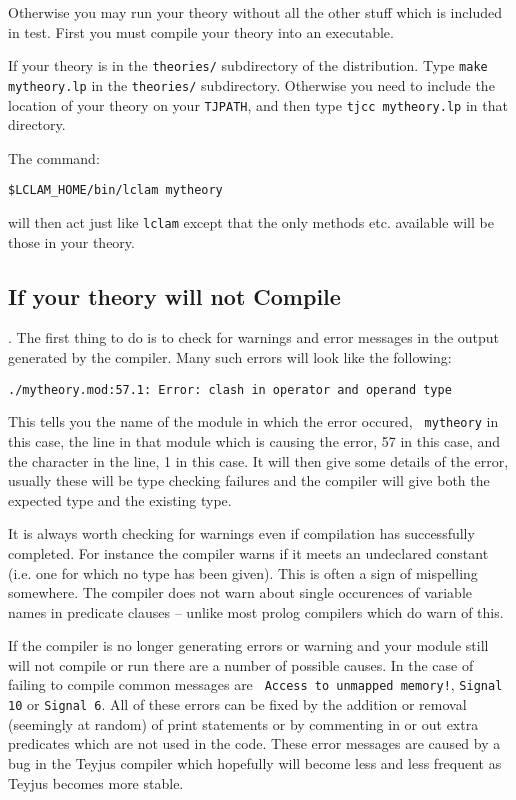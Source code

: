 Otherwise you may run your theory without all the other stuff
which is included in test.  First you must compile your theory into an 
executable.

If your theory is in the {\tt theories/} subdirectory of the
distribution.  Type {\tt make mytheory.lp} in the {\tt theories/}
subdirectory.  Otherwise you need to include the location of your
theory on your {\tt TJPATH}, and then type {\tt tjcc
  mytheory.lp} in that directory.  

The command:

{\tt \$LCLAM\_HOME/bin/lclam mytheory}

will then act just like {\tt lclam} except that the only methods 
etc. available will be those in your theory.

\subsection{If your theory will not Compile}.
The first thing to do is to check for warnings and error messages in
the output generated by the compiler.   Many such errors will look
like the following:
\begin{verbatim}
./mytheory.mod:57.1: Error: clash in operator and operand type
\end{verbatim}
This tells you the name of the module in which the error occured, {\tt
  mytheory} in this case, the line in that module which is causing the 
error, 57 in this case, and the character in the line, 1 in this
case.  It will then give some details of the error, usually these will 
be type checking failures and the compiler will give both the expected 
type and the existing type.  

It is always worth checking for warnings even if compilation has
successfully completed.  For instance the compiler warns if it meets
an undeclared constant (i.e. one for which no type has been given).
This is often a sign of mispelling somewhere.  The compiler does not
warn about single occurences of variable names in predicate clauses -- 
unlike most prolog compilers which do warn of this.

If the compiler is no longer generating errors or warning and your
module still will not compile or run there are a number of possible
causes.  In the case of failing to compile common messages are {\tt
  Access to unmapped memory!}, {\tt Signal 10} or {\tt Signal 6}.  All
of these errors can be fixed by the addition or removal (seemingly at
random) of print statements or by commenting in or out extra
predicates which are not used in the code.  These error messages are
caused by a bug in the Teyjus compiler which hopefully will become
less and less frequent as Teyjus becomes more stable.


